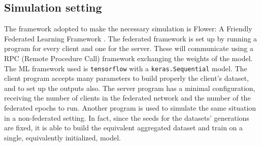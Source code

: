 \documentclass{article} %
\newcounter{other}
\newcounter{late}
\begin{document}
\subsection{Simulation setting}
The framework adopted to make the necessary simulation is Flower: A Friendly Federated 
Learning Framework \cite{beutel2021flower}.
The federated framework is set up by running a program for every client and one for 
the server.
These will communicate using a RPC (Remote Procedure Call) framework exchanging the 
weights of the model.
The ML framework used is \verb|tensorflow| with a \verb|keras.Sequential| model.
The client program accepts many parameters to build properly the client's dataset, and 
to set up the outputs also.
The server program has a minimal configuration, receiving the number of clients in the 
federated network and the number of the federated epochs to run.
Another program is used to simulate the same situation in a non-federated setting. 
In fact, since the seeds for the datasets' generations are fixed, it is able to build the 
equivalent aggregated dataset and train on a single, equivalently initialized, model.
\end{document}
